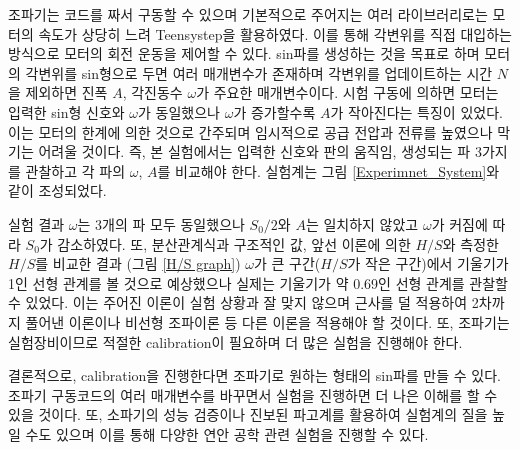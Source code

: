 \begin{summary}
    조파기는 코드를 짜서 구동할 수 있으며 기본적으로 주어지는 여러 라이브러리로는 모터의 속도가 상당히 느려 Teensystep을 활용하였다. 이를 통해 각변위를 직접 대입하는 방식으로 모터의 회전 운동을 제어할 수 있다. sin파를 생성하는 것을 목표로 하며 모터의 각변위를 sin형으로 두면 여러 매개변수가 존재하며 각변위를 업데이트하는 시간 $N$을 제외하면 진폭 $A$, 각진동수 $\omega$가 주요한 매개변수이다. 시험 구동에 의하면 모터는 입력한 sin형 신호와 $\omega$가 동일했으나 $\omega$가 증가할수록 $A$가 작아진다는 특징이 있었다. 이는 모터의 한계에 의한 것으로 간주되며 임시적으로 공급 전압과 전류를 높였으나 막기는 어려울 것이다. 즉, 본 실험에서는 입력한 신호와 판의 움직임, 생성되는 파 3가지를 관찰하고 각 파의 $\omega$, $A$를 비교해야 한다. 실험계는 그림 \ref{Experimnet_System}와 같이 조성되었다.

    실험 결과 $\omega$는 3개의 파 모두 동일했으나 $S_0/2$와 $A$는 일치하지 않았고 $\omega$가 커짐에 따라 $S_{0}$가 감소하였다. 또, 분산관계식과 구조적인 값, 앞선 이론에 의한 $H/S$와 측정한 $H/S$를 비교한 결과 (그림 \ref{H/S graph}) $\omega$가 큰 구간($H/S$가 작은 구간)에서 기울기가 1인 선형 관계를 볼 것으로 예상했으나 실제는 기울기가 약 0.69인 선형 관계를 관찰할 수 있었다. 이는 주어진 이론이 실험 상황과 잘 맞지 않으며 근사를 덜 적용하여 2차까지 풀어낸 이론이나 비선형 조파이론 등 다른 이론을 적용해야 할 것이다. 또, 조파기는 실험장비이므로 적절한 calibration이 필요하며 더 많은 실험을 진행해야 한다.

    결론적으로, calibration을 진행한다면 조파기로 원하는 형태의 sin파를 만들 수 있다. 조파기 구동코드의 여러 매개변수를 바꾸면서 실험을 진행하면 더 나은 이해를 할 수 있을 것이다. 또, 소파기의 성능 검증이나 진보된 파고계를 활용하여 실험계의 질을 높일 수도 있으며 이를 통해 다양한 연안 공학 관련 실험을 진행할 수 있다.

\end{summary}
 